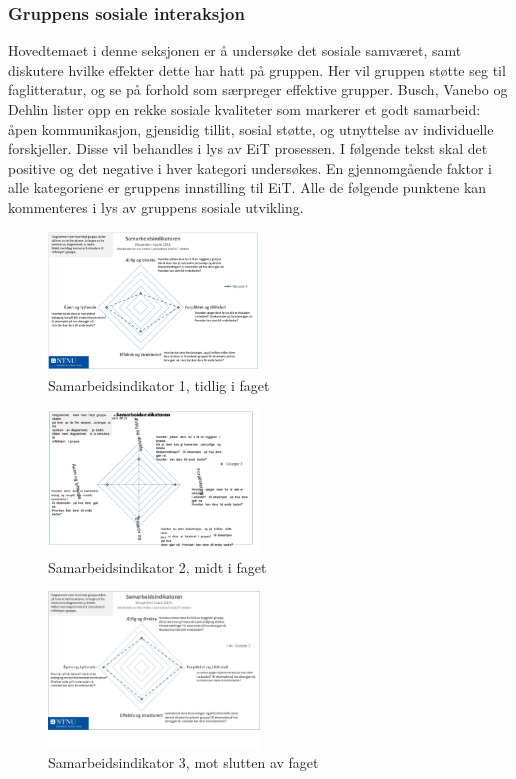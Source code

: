 \subsubsection{Gruppens sosiale interaksjon}

Hovedtemaet i denne seksjonen er å undersøke det sosiale samværet, samt diskutere hvilke effekter dette har hatt på gruppen.
Her vil gruppen støtte seg til faglitteratur\cite{orgorg}, og se på forhold som særpreger effektive grupper. 
Busch, Vanebo og Dehlin\cite[p.~257]{orgorg} lister opp en rekke sosiale kvaliteter som markerer et godt samarbeid: åpen kommunikasjon, gjensidig tillit, sosial støtte, og utnyttelse av individuelle forskjeller.
Disse vil behandles i lys av EiT prosessen.
I følgende tekst skal det positive og det negative i hver kategori undersøkes.
En gjennomgående faktor i alle kategoriene er gruppens innstilling til EiT. 
Alle de følgende punktene kan kommenteres i lys av gruppens sosiale utvikling. 

\begin{figure}[h!]
  \caption{Samarbeidsindikator 1, tidlig i faget}
  \centering
    \includegraphics[width=0.5\textwidth]{Bilder/samarbeidsindikator1.png}
\end{figure}\label{samarbeidsindikator1}

\begin{figure}[h!]
  \caption{Samarbeidsindikator 2, midt i faget}
  \centering
    \includegraphics[width=0.5\textwidth]{Bilder/samarbeidsindikator_2.png}
\end{figure}\label{samarbeidsindikator2}

\begin{figure}[h!]
  \caption{Samarbeidsindikator 3, mot slutten av faget}
  \centering
    \includegraphics[width=0.5\textwidth]{Bilder/samarbeidsindikator_3.jpg}
\end{figure}\label{samarbeidsindikator3}

